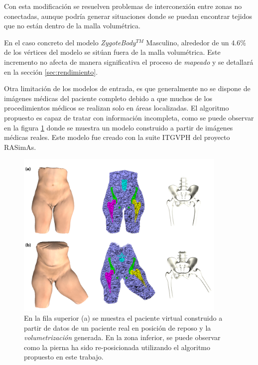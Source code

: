 %





%


Con esta modificación se resuelven problemas de interconexión entre zonas no conectadas, aunque podría generar situaciones donde se puedan encontrar tejidos que no están dentro de la malla volumétrica. %

En el caso concreto del modelo \emph{ZygoteBody}$^{TM}$ Masculino, alrededor de un 4.6\% de los vértices del modelo se sitúan fuera de la malla volumétrica. 
Este incremento no afecta de manera significativa el proceso de \emph{mapeado} y se detallará en la sección  \ref{sec:rendimiento}.

Otra limitación de los modelos de entrada, es que generalmente no se dispone de imágenes médicas del paciente completo debido a que muchos de los procedimientos médicos se realizan solo en áreas localizadas.
El algoritmo propuesto es capaz de tratar con información incompleta, como se puede observar en la figura \ref{fig:patient} donde se muestra un modelo construido a partir de imágenes médicas reales. Este modelo fue creado con la suite \ac{ITGVPH} del proyecto \ac{RASimAs}.

\begin{figure}[ht]
   \centering
    \includegraphics[width=0.9\textwidth]{IMG/patient.png}
    \caption{En la fila superior (a) se muestra el paciente virtual construido a partir de datos de un paciente real en posición de reposo y la \emph{volumetrización} generada. En la zona inferior, se puede observar como la pierna ha sido re-posicionada utilizando el algoritmo propuesto en este trabajo.
    }
   \label{fig:patient}
\end{figure}


